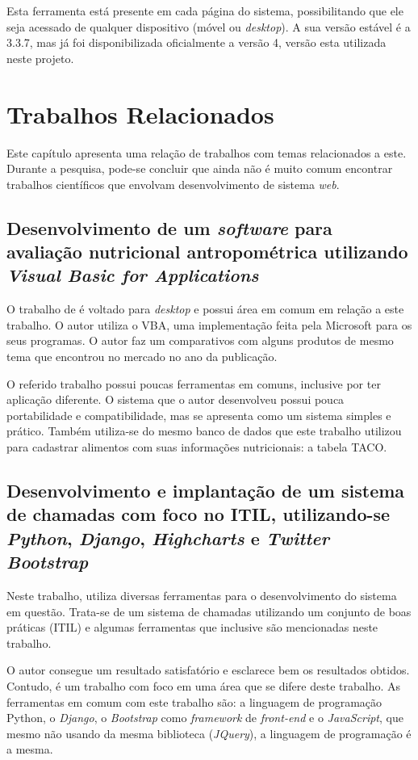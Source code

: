 \documentclass[
	12pt,				%
    oneside,			%
	a4paper,			%
	english,			%
	french,				%
	spanish,			%
	brazil,				%
	]{abntex2}
\begin{document}
Esta ferramenta está presente em cada página do sistema, possibilitando que ele seja acessado de qualquer dispositivo (móvel ou \textit{desktop}). A sua versão estável é a 3.3.7, mas já foi disponibilizada oficialmente a versão 4, versão esta utilizada neste projeto.
\chapter{Trabalhos Relacionados}

Este capítulo apresenta uma relação de trabalhos com temas relacionados a este. Durante a pesquisa, pode-se concluir que ainda não é muito comum encontrar trabalhos científicos que envolvam desenvolvimento de sistema \textit{web}. 

\section{Desenvolvimento de um \textit{software} para avaliação nutricional antropométrica utilizando \textit{Visual Basic for Applications}}

O trabalho de  é voltado para \textit{desktop} e possui área em comum em relação a este trabalho. O autor utiliza o VBA, uma implementação feita pela Microsoft para os seus programas. O autor faz um comparativos com alguns produtos de mesmo tema que encontrou no mercado no ano da publicação.

O referido trabalho possui poucas ferramentas em comuns, inclusive por ter aplicação diferente. O sistema que o autor desenvolveu possui pouca portabilidade e compatibilidade, mas se apresenta como um sistema simples e prático. Também utiliza-se do mesmo banco de dados que este trabalho utilizou para cadastrar alimentos com suas informações nutricionais: a tabela TACO.


\section{Desenvolvimento e implantação de um sistema de chamadas com foco no ITIL, utilizando-se \textit{Python}, \textit{Django}, \textit{Highcharts} e \textit{Twitter Bootstrap}}

Neste trabalho,  utiliza diversas ferramentas para o desenvolvimento do sistema em questão. Trata-se de um sistema de chamadas utilizando um conjunto de boas práticas (ITIL) e algumas ferramentas que inclusive são mencionadas neste trabalho. 

O autor consegue um resultado satisfatório e esclarece bem os resultados obtidos. Contudo, é um trabalho com foco em uma área que se difere deste trabalho. As ferramentas em comum com este trabalho são: a linguagem de programação Python, o \textit{Django}, o \textit{Bootstrap} como \textit{framework} de \textit{front-end} e o \textit{JavaScript}, que mesmo não usando da mesma biblioteca (\textit{JQuery}), a linguagem de programação é a mesma.
\end{document}
